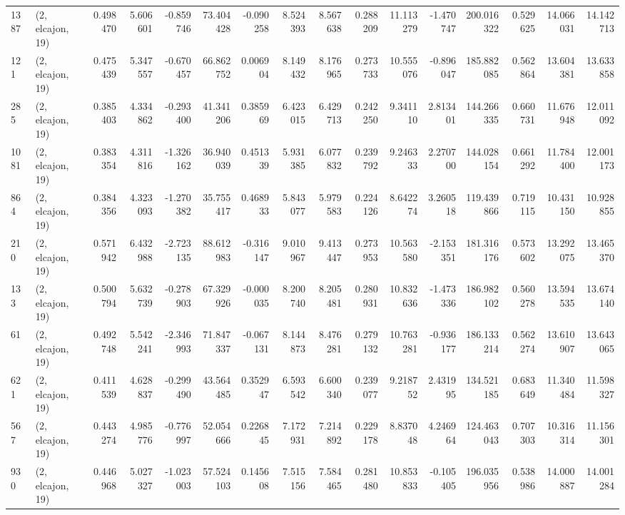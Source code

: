 \begin{tabular}{llrrrrrrrrrrrrrr}
1387 &  (2, elcajon, 19) &   0.498470 &   5.606601 &  -0.859746 &     73.404428 &   -0.090258 &    8.524393 &    8.567638 &  0.288209 &  11.113279 &  -1.470747 &   200.016322 &   0.529625 &  14.066031 &  14.142713 \\
121  &  (2, elcajon, 19) &   0.475439 &   5.347557 &  -0.670457 &     66.862752 &    0.006904 &    8.149432 &    8.176965 &  0.273733 &  10.555076 &  -0.896047 &   185.882085 &   0.562864 &  13.604381 &  13.633858 \\
285  &  (2, elcajon, 19) &   0.385403 &   4.334862 &  -0.293400 &     41.341206 &    0.385969 &    6.423015 &    6.429713 &  0.242250 &   9.341110 &   2.813401 &   144.266335 &   0.660731 &  11.676948 &  12.011092 \\
1081 &  (2, elcajon, 19) &   0.383354 &   4.311816 &  -1.326162 &     36.940039 &    0.451339 &    5.931385 &    6.077832 &  0.239792 &   9.246333 &   2.270700 &   144.028154 &   0.661292 &  11.784400 &  12.001173 \\
864  &  (2, elcajon, 19) &   0.384356 &   4.323093 &  -1.270382 &     35.755417 &    0.468933 &    5.843077 &    5.979583 &  0.224126 &   8.642274 &   3.260518 &   119.439866 &   0.719115 &  10.431150 &  10.928855 \\
210  &  (2, elcajon, 19) &   0.571942 &   6.432988 &  -2.723135 &     88.612983 &   -0.316147 &    9.010967 &    9.413447 &  0.273953 &  10.563580 &  -2.153351 &   181.316176 &   0.573602 &  13.292075 &  13.465370 \\
133  &  (2, elcajon, 19) &   0.500794 &   5.632739 &  -0.278903 &     67.329926 &   -0.000035 &    8.200740 &    8.205481 &  0.280931 &  10.832636 &  -1.473336 &   186.982102 &   0.560278 &  13.594535 &  13.674140 \\
61   &  (2, elcajon, 19) &   0.492748 &   5.542241 &  -2.346993 &     71.847337 &   -0.067131 &    8.144873 &    8.476281 &  0.279132 &  10.763281 &  -0.936177 &   186.133214 &   0.562274 &  13.610907 &  13.643065 \\
621  &  (2, elcajon, 19) &   0.411539 &   4.628837 &  -0.299490 &     43.564485 &    0.352947 &    6.593542 &    6.600340 &  0.239077 &   9.218752 &   2.431995 &   134.521185 &   0.683649 &  11.340484 &  11.598327 \\
567  &  (2, elcajon, 19) &   0.443274 &   4.985776 &  -0.776997 &     52.054666 &    0.226845 &    7.172931 &    7.214892 &  0.229178 &   8.837048 &   4.246964 &   124.463043 &   0.707303 &  10.316314 &  11.156301 \\
930  &  (2, elcajon, 19) &   0.446968 &   5.027327 &  -1.023003 &     57.524103 &    0.145608 &    7.515156 &    7.584465 &  0.281480 &  10.853833 &  -0.105405 &   196.035956 &   0.538986 &  14.000887 &  14.001284 \\

\end{tabular}

